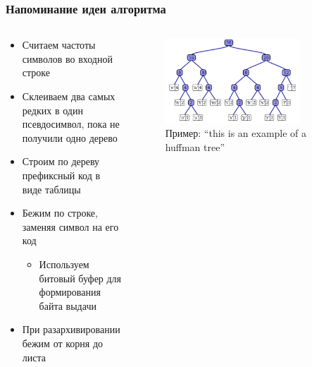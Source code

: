 \documentclass{../../slides-style}
\begin{document}
    \begin{frame}[plain]
        \titlepage
    \end{frame}

    \begin{frame}
        \frametitle{Напоминание идеи алгоритма}
        \begin{columns}
            \begin{column}{0.5\textwidth}
                \begin{itemize}
                    \item Считаем частоты символов во входной строке
                    \item Склеиваем два самых редких в один псевдосимвол, пока не получили одно дерево
                    \item Строим по дереву префиксный код в виде таблицы
                    \item Бежим по строке, заменяя символ на его код
                    \begin{itemize}
                        \item Используем битовый буфер для формирования байта выдачи
                    \end{itemize}
                    \item При разархивировании бежим от корня до листа
                \end{itemize}
            \end{column}
            \begin{column}{0.5\textwidth}
                \begin{figure}[htp]
                    \centering
                    \includegraphics[width=0.8\textwidth]{huffman-tree.png}
                    Пример: ``this is an example of a huffman tree''
                \end{figure}
            \end{column}
        \end{columns}
    \end{frame}
\end{document}
